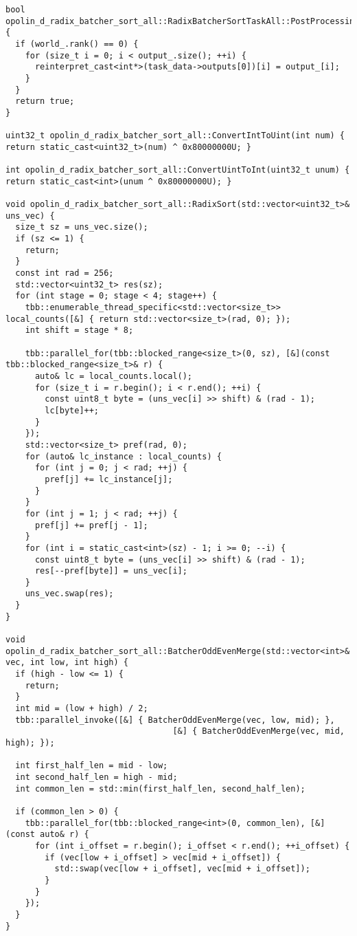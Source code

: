 \documentclass[12pt,a4paper]{extarticle}
\begin{document}
\begin{lstlisting}
bool opolin_d_radix_batcher_sort_all::RadixBatcherSortTaskAll::PostProcessingImpl() {
  if (world_.rank() == 0) {
    for (size_t i = 0; i < output_.size(); ++i) {
      reinterpret_cast<int*>(task_data->outputs[0])[i] = output_[i];
    }
  }
  return true;
}

uint32_t opolin_d_radix_batcher_sort_all::ConvertIntToUint(int num) { return static_cast<uint32_t>(num) ^ 0x80000000U; }

int opolin_d_radix_batcher_sort_all::ConvertUintToInt(uint32_t unum) { return static_cast<int>(unum ^ 0x80000000U); }

void opolin_d_radix_batcher_sort_all::RadixSort(std::vector<uint32_t>& uns_vec) {
  size_t sz = uns_vec.size();
  if (sz <= 1) {
    return;
  }
  const int rad = 256;
  std::vector<uint32_t> res(sz);
  for (int stage = 0; stage < 4; stage++) {
    tbb::enumerable_thread_specific<std::vector<size_t>> local_counts([&] { return std::vector<size_t>(rad, 0); });
    int shift = stage * 8;

    tbb::parallel_for(tbb::blocked_range<size_t>(0, sz), [&](const tbb::blocked_range<size_t>& r) {
      auto& lc = local_counts.local();
      for (size_t i = r.begin(); i < r.end(); ++i) {
        const uint8_t byte = (uns_vec[i] >> shift) & (rad - 1);
        lc[byte]++;
      }
    });
    std::vector<size_t> pref(rad, 0);
    for (auto& lc_instance : local_counts) {
      for (int j = 0; j < rad; ++j) {
        pref[j] += lc_instance[j];
      }
    }
    for (int j = 1; j < rad; ++j) {
      pref[j] += pref[j - 1];
    }
    for (int i = static_cast<int>(sz) - 1; i >= 0; --i) {
      const uint8_t byte = (uns_vec[i] >> shift) & (rad - 1);
      res[--pref[byte]] = uns_vec[i];
    }
    uns_vec.swap(res);
  }
}

void opolin_d_radix_batcher_sort_all::BatcherOddEvenMerge(std::vector<int>& vec, int low, int high) {
  if (high - low <= 1) {
    return;
  }
  int mid = (low + high) / 2;
  tbb::parallel_invoke([&] { BatcherOddEvenMerge(vec, low, mid); }, 
                                  [&] { BatcherOddEvenMerge(vec, mid, high); });

  int first_half_len = mid - low;
  int second_half_len = high - mid;
  int common_len = std::min(first_half_len, second_half_len);

  if (common_len > 0) {
    tbb::parallel_for(tbb::blocked_range<int>(0, common_len), [&](const auto& r) {
      for (int i_offset = r.begin(); i_offset < r.end(); ++i_offset) {
        if (vec[low + i_offset] > vec[mid + i_offset]) {
          std::swap(vec[low + i_offset], vec[mid + i_offset]);
        }
      }
    });
  }
}
\end{lstlisting}
\end{document}
